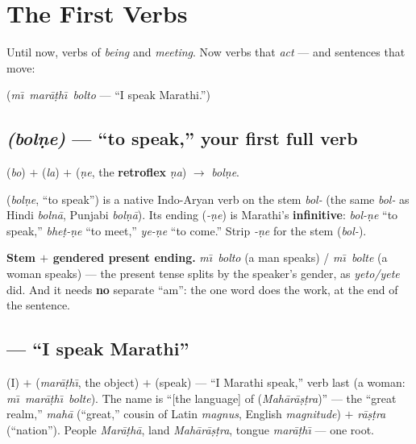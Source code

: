 \chapter{The First Verbs}
\label{ch:first-verbs}

Until now, verbs of \emph{being} and \emph{meeting}. Now verbs that \emph{act}
--- and sentences that move:

\begin{center}
 \quad(\emph{m\=\i\ mar\=a\d{t}h\=\i\ bolto} --- ``I speak Marathi.'')
\end{center}

\section{ \emph{(bol\d{n}e)} --- ``to speak,'' your first full verb}
\label{lesson:bolne}

\begin{sounds}
 (\emph{bo}) $+$  (\emph{la}) $+$  (\emph{\d{n}e}, the
\textbf{retroflex}  \emph{\d{n}a}) $\to$ \emph{bol\d{n}e}.
\end{sounds}

\begin{cousinweb}
 (\emph{bol\d{n}e}, ``to speak'') is a native Indo-Aryan verb on the
stem \emph{bol-} (the same \emph{bol-} as Hindi \emph{boln\=a}, Punjabi
\emph{bol\d{n}\=a}). Its ending  (\emph{-\d{n}e}) is Marathi's
\textbf{infinitive}: \emph{bol-\d{n}e} ``to speak,'' \emph{bhe\d{t}-\d{n}e} ``to
meet,'' \emph{ye-\d{n}e} ``to come.'' Strip \emph{-\d{n}e} for the stem
(\emph{bol-}).
\end{cousinweb}

\begin{grammarlens}
\textbf{Stem $+$ gendered present ending.} \emph{m\=\i\ bolto} (a man speaks) /
\emph{m\=\i\ bolte} (a woman speaks) --- the present tense splits by the speaker's
gender, as \emph{yeto/yete} did. And it needs \textbf{no} separate ``am'': the
one word does the work, at the end of the sentence.
\end{grammarlens}

\section{ --- ``I speak Marathi''}
\label{lesson:mi-marathi-bolto}

 (I) $+$  (\emph{mar\=a\d{t}h\=\i}, the object) $+$ 
(speak) --- ``I Marathi speak,'' verb last (a woman: \emph{m\=\i\ mar\=a\d{t}h\=\i\
bolte}). The name  is ``[the language] of 
(\emph{Mah\=ar\=a\d{s}\d{t}ra})'' --- the ``great realm,'' \emph{mah\=a}
(``great,'' cousin of Latin \emph{magnus}, English \emph{magnitude}) $+$
\emph{r\=a\d{s}\d{t}ra} (``nation''). People \emph{Mar\=a\d{t}h\=a}, land
\emph{Mah\=ar\=a\d{s}\d{t}ra}, tongue \emph{mar\=a\d{t}h\=\i} --- one root.

